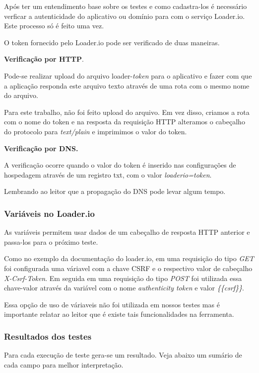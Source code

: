   Após ter um entendimento base sobre os testes e como cadastra-los é necessário verficar a autenticidade do 
  aplicativo ou domínio para com o serviço Loader.io. Este processo só é feito uma vez. 
  
  O token fornecido pelo Loader.io pode ser verificado de duas maneiras.
  
  \textbf{Verificação por HTTP}.
  
  Pode-se realizar upload do arquivo loader-\textit{token} para o aplicativo e fazer com que a aplicação
  responda este arquivo texto através de uma rota com o mesmo nome do arquivo. 
  
  Para este trabalho, não foi feito upload do arquivo. Em vez disso, criamos a rota com o nome do token e
  na resposta da requisição \ac{HTTP} alteramos o cabeçalho do protocolo para \textit{text/plain} e imprimimos
  o valor do token.
  
  \textbf{Verificação por DNS.}
  
  A verificação ocorre quando o valor do token é inserido nas configurações de hospedagem através de um
  registro txt, com o valor \textit{loaderio=token}.
  
  Lembrando ao leitor que a propagação do \ac{DNS} pode levar algum tempo.
  
\subsubsection{Variáveis no Loader.io}

  As variáveis permitem usar dados de um cabeçalho de resposta \ac{HTTP} anterior e passa-los para o próximo
  teste.
  
  Como no exemplo da documentação do loader.io, em uma requisição do tipo \textit{GET} foi configurada uma váriavel
  com a chave \ac{CSRF} e o respectivo valor de cabeçalho \textit{X-Csrf-Token}. Em seguida em uma requisição 
  do tipo \textit{POST} foi utilizada essa chave-valor através da variável com o nome \textit{authenticity token} e valor
  \textit{\{\{csrf\}\}}.
  
  Essa opção de uso de váriaveis não foi utilizada em nossos testes mas é importante relatar ao leitor que
  é existe tais funcionalidades na ferramenta.

  
\subsubsection{Resultados dos testes}

  Para cada execução de teste gera-se um resultado. Veja abaixo um sumário de cada campo para melhor interpretação.
  
